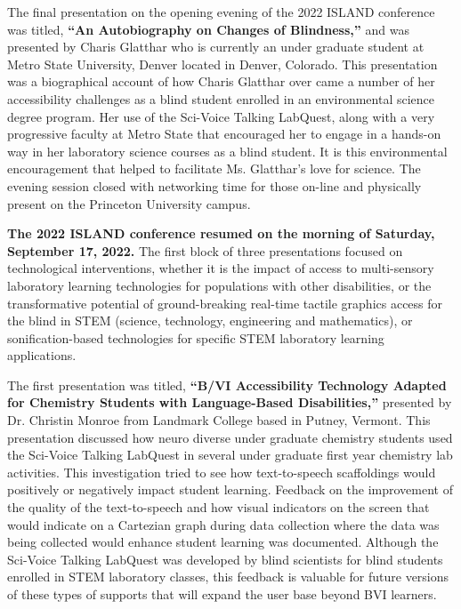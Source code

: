 \documentclass[11.5pt]{sig-alternate}
\begin{document}
\begin{large}
The final presentation on the opening evening of the 2022 ISLAND conference was titled, \textbf{“An Autobiography on Changes of Blindness,”} and was presented by Charis Glatthar who is currently an under graduate student at Metro State University, Denver located in Denver, Colorado. This presentation was a biographical account of how Charis Glatthar over came a number of her accessibility challenges as a blind student enrolled in an environmental science degree program. Her use of the Sci-Voice Talking LabQuest, along with a very progressive faculty at Metro State that encouraged her to engage in a hands-on way in her laboratory science courses as a blind student. It is this environmental encouragement that helped to facilitate Ms. Glatthar’s love for science. The evening session closed with networking time for those on-line and physically present on the Princeton University campus.

\textbf{The 2022 ISLAND conference resumed on the morning of Saturday, September 17, 2022.} The first block of three presentations focused on technological interventions, whether it is the impact of access to multi-sensory laboratory learning technologies for populations with other disabilities, or the transformative potential of ground-breaking real-time tactile graphics access for the blind in STEM (science, technology, engineering and mathematics), or sonification-based technologies for specific STEM laboratory learning applications. 

The first presentation was titled, \textbf{“B/VI Accessibility Technology Adapted for Chemistry Students with Language-Based Disabilities,”} presented by Dr. Christin Monroe from Landmark College based in Putney, Vermont. This presentation discussed how neuro diverse under graduate chemistry students used the Sci-Voice Talking LabQuest in several under graduate first year chemistry lab activities. This investigation tried to see how text-to-speech scaffoldings would positively or negatively impact student learning. Feedback on the improvement of the quality of the text-to-speech and how visual indicators on the screen that would indicate on a Cartezian graph during data collection where the data was being collected would enhance student learning was documented. Although the Sci-Voice Talking LabQuest was developed by blind scientists for blind students enrolled in STEM laboratory classes, this feedback is valuable for future versions of these types of supports that will expand the user base beyond BVI learners.


\end{large}
\end{document}
